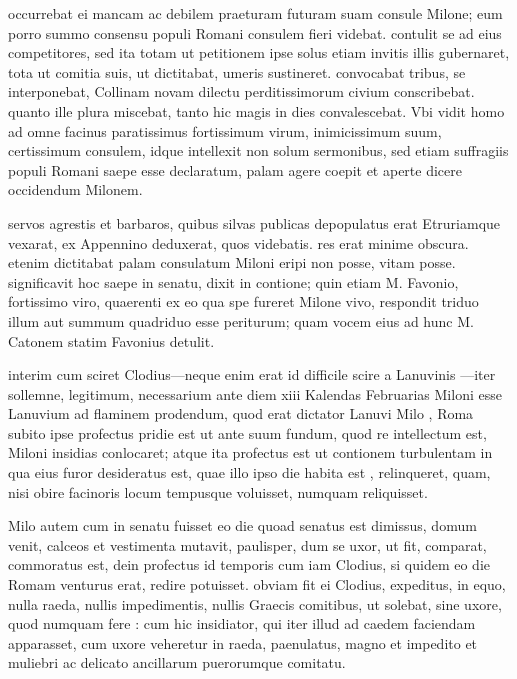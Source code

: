  occurrebat ei mancam ac debilem praeturam futuram suam consule Milone; eum porro summo consensu populi Romani consulem fieri videbat. contulit se ad eius competitores, sed ita totam ut petitionem ipse solus etiam invitis illis gubernaret, tota ut comitia suis, ut dictitabat, umeris sustineret. convocabat tribus, se interponebat, Collinam novam dilectu perditissimorum civium conscribebat. quanto ille plura miscebat, tanto hic magis in dies convalescebat. Vbi vidit homo ad omne facinus paratissimus fortissimum virum, inimicissimum suum, certissimum consulem, idque intellexit non solum sermonibus, sed etiam suffragiis populi Romani saepe esse declaratum, palam agere coepit et aperte dicere occidendum Milonem.

 servos agrestis et barbaros, quibus silvas publicas depopulatus erat Etruriamque vexarat, ex Appennino deduxerat, quos videbatis. res erat minime obscura. etenim dictitabat palam consulatum Miloni eripi non posse, vitam posse. significavit hoc saepe in senatu, dixit in contione; quin etiam M. Favonio, fortissimo viro, quaerenti ex eo qua spe fureret Milone vivo, respondit triduo illum aut summum quadriduo esse periturum; quam vocem eius ad hunc M. Catonem statim Favonius detulit.

 interim cum sciret Clodius—neque enim erat id difficile scire a Lanuvinis —iter sollemne, legitimum, necessarium ante diem xiii Kalendas Februarias Miloni esse Lanuvium ad flaminem prodendum, quod erat dictator Lanuvi Milo , Roma subito ipse profectus pridie est ut ante suum fundum, quod re intellectum est, Miloni insidias conlocaret; atque ita profectus est ut contionem turbulentam in qua eius furor desideratus est, quae illo ipso die habita est , relinqueret, quam, nisi obire facinoris locum tempusque voluisset, numquam reliquisset.

 Milo autem cum in senatu fuisset eo die quoad senatus est dimissus, domum venit, calceos et vestimenta mutavit, paulisper, dum se uxor, ut fit, comparat, commoratus est, dein profectus id temporis cum iam Clodius, si quidem eo die Romam venturus erat, redire potuisset. obviam fit ei Clodius, expeditus, in equo, nulla raeda, nullis impedimentis, nullis Graecis comitibus, ut solebat, sine uxore, quod numquam fere : cum hic insidiator, qui iter illud ad caedem faciendam apparasset, cum uxore veheretur in raeda, paenulatus, magno et impedito et muliebri ac delicato ancillarum puerorumque comitatu.

